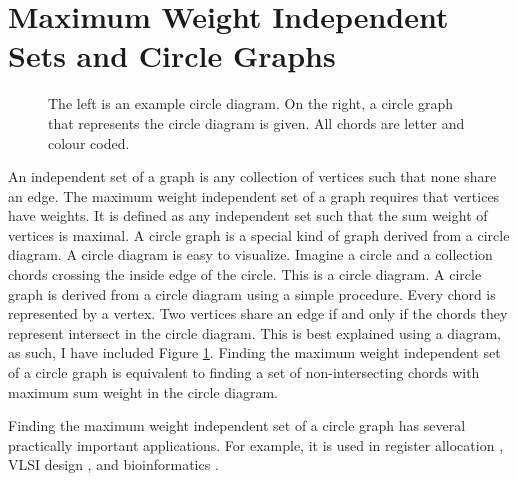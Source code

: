\documentclass[12pt, a4paper]{article}
\begin{document}
\section{Maximum Weight Independent Sets and Circle Graphs}

\begin{figure}
\begin{center}
\end{center}
\caption{The left is an example circle diagram. On the right, a circle graph that represents the circle diagram is given. All chords are letter and colour coded.}
\label{fig:circle2graph}
\end{figure}

An independent set of a graph is any collection of vertices such that none share an edge. The maximum weight independent set of a graph requires that vertices have weights. It is defined as any independent set such that the sum weight of vertices is maximal. A circle graph is a special kind of graph derived from a circle diagram. A circle diagram is easy to visualize. Imagine a circle and a collection chords crossing the inside edge of the circle. This is a circle diagram. A circle graph is derived from a circle diagram using a simple procedure. Every chord is represented by a vertex. Two vertices share an edge if and only if the chords they represent intersect in the circle diagram. This is best explained using a diagram, as such, I have included Figure \ref{fig:circle2graph}. Finding the maximum weight independent set of a circle graph is equivalent to finding a set of non-intersecting chords with maximum sum weight in the circle diagram.

Finding the maximum weight independent set of a circle graph has several practically important applications. For example, it is used in register allocation \cite{de1999graph}, VLSI design \cite{cong1990over}, and bioinformatics \cite{swenson2009maximum}.
\end{document}
